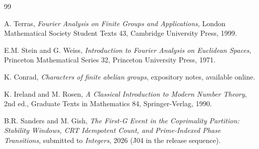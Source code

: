 \documentclass[11pt,reqno]{amsart}
\theoremstyle{definition}
\begin{document}
\begin{thebibliography}{99}

A. Terras, \emph{Fourier Analysis on Finite Groups and
Applications}, London Mathematical Society Student Texts 43,
Cambridge University Press, 1999.

E.M. Stein and G. Weiss, \emph{Introduction to Fourier Analysis on
Euclidean Spaces}, Princeton Mathematical Series 32, Princeton
University Press, 1971.

K. Conrad, \emph{Characters of finite abelian groups}, expository
notes, available online.

K. Ireland and M. Rosen, \emph{A Classical Introduction to Modern
Number Theory}, 2nd ed., Graduate Texts in Mathematics 84,
Springer-Verlag, 1990.

B.R. Sanders and M. Gish, \emph{The First-G Event in the
Coprimality Partition: Stability Windows, CRT Idempotent Count,
and Prime-Indexed Phase Transitions}, submitted to
\emph{Integers}, 2026 (J04 in the release sequence).

\end{thebibliography}
\end{document}

